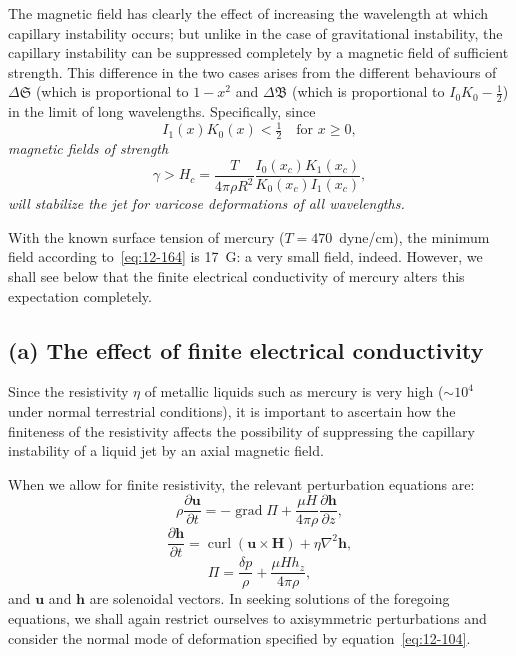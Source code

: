 The magnetic field has clearly the effect of increasing the wavelength at which capillary instability occurs; but unlike in the case of gravitational instability, the capillary instability can be suppressed completely by a magnetic field of sufficient strength. This difference in the two cases arises from the different behaviours of $\Delta\mathfrak{S}$ (which is proportional to $1-x^2$ and $\Delta\mathfrak{B}$ (which is proportional to $I_0 K_0 - \frac{1}{2}$) in the limit of long wavelengths. Specifically, since
\begin{equation}
\label{eq:12-163}
I_1(x) K_0(x) < \tfrac{1}{2} \quad \text{for } x \geq 0,
\end{equation}
\emph{magnetic fields of strength}
\begin{equation}
\label{eq:12-164}
\gamma > H_c = \frac{T}{4\pi\rho R^2}\frac{I_0(x_c)K_1(x_c)}{K_0(x_c)I_1(x_c)},
\end{equation}
\emph{will stabilize the jet for varicose deformations of all wavelengths.}

With the known surface tension of mercury ($T = 470$~dyne/cm), the minimum field according to~\eqref{eq:12-164} is 17~G: a very small field, indeed. However, we shall see below that the finite electrical conductivity of mercury alters this expectation completely.

\subsection*{(a) The effect of finite electrical conductivity}

Since the resistivity $\eta$ of metallic liquids such as mercury is very high ($\sim 10^4$ under normal terrestrial conditions), it is important to ascertain how the finiteness of the resistivity affects the possibility of suppressing the capillary instability of a liquid jet by an axial magnetic field.

When we allow for finite resistivity, the relevant perturbation equations are:
\begin{equation}
\label{eq:12-165}
\rho\frac{\partial \mathbf{u}}{\partial t} = -\operatorname{grad}\Pi + \frac{\mu H}{4\pi\rho}\frac{\partial \mathbf{h}}{\partial z},
\end{equation}
\begin{equation}
\label{eq:12-166}
\frac{\partial \mathbf{h}}{\partial t} = \operatorname{curl}(\mathbf{u}\times\mathbf{H}) + \eta\nabla^2\mathbf{h},
\end{equation}
\begin{equation}
\label{eq:12-167}
\Pi = \frac{\delta p}{\rho} + \frac{\mu H h_z}{4\pi\rho},
\end{equation}
and $\mathbf{u}$ and $\mathbf{h}$ are solenoidal vectors. In seeking solutions of the foregoing equations, we shall again restrict ourselves to axisymmetric perturbations and consider the normal mode of deformation specified by equation~\eqref{eq:12-104}.

